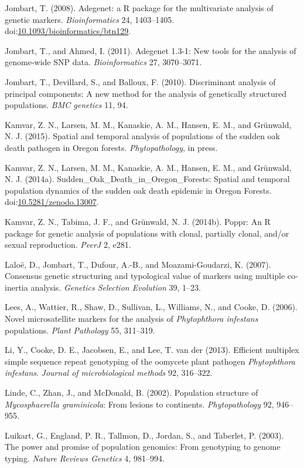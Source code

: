 \documentclass{frontiersSCNS} %
\begin{document}
Jombart, T. (2008). Adegenet: a R package for the multivariate analysis
of genetic markers. \emph{Bioinformatics} 24, 1403--1405.
doi:\href{http://dx.doi.org/10.1093/bioinformatics/btn129}{10.1093/bioinformatics/btn129}.

Jombart, T., and Ahmed, I. (2011). Adegenet 1.3-1: New tools for the
analysis of genome-wide SNP data. \emph{Bioinformatics} 27, 3070--3071.

Jombart, T., Devillard, S., and Balloux, F. (2010). Discriminant
analysis of principal components: A new method for the analysis of
genetically structured populations. \emph{BMC genetics} 11, 94.

Kamvar, Z. N., Larsen, M. M., Kanaskie, A. M., Hansen, E. M., and
Grünwald, N. J. (2015). Spatial and temporal analysis of populations of
the sudden oak death pathogen in Oregon forests. \emph{Phytopathology},
in press.

Kamvar, Z. N., Larsen, M. M., Kanaskie, A. M., Hansen, E. M., and
Grünwald, N. J. (2014a). Sudden\_Oak\_Death\_in\_Oregon\_Forests:
Spatial and temporal population dynamics of the sudden oak death
epidemic in Oregon Forests.
doi:\href{http://dx.doi.org/10.5281/zenodo.13007}{10.5281/zenodo.13007}.

Kamvar, Z. N., Tabima, J. F., and Gr{ü}nwald, N. J. (2014b). Poppr: An R
package for genetic analysis of populations with clonal, partially
clonal, and/or sexual reproduction. \emph{PeerJ} 2, e281.

Lalo{ë}, D., Jombart, T., Dufour, A.-B., and Moazami-Goudarzi, K.
(2007). Consensus genetic structuring and typological value of markers
using multiple co-inertia analysis. \emph{Genetics Selection Evolution}
39, 1--23.

Lees, A., Wattier, R., Shaw, D., Sullivan, L., Williams, N., and Cooke,
D. (2006). Novel microsatellite markers for the analysis of
\emph{Phytophthora infestans} populations. \emph{Plant Pathology} 55,
311--319.

Li, Y., Cooke, D. E., Jacobsen, E., and Lee, T. van der (2013).
Efficient multiplex simple sequence repeat genotyping of the oomycete
plant pathogen \emph{Phytophthora infestans}. \emph{Journal of
microbiological methods} 92, 316--322.

Linde, C., Zhan, J., and McDonald, B. (2002). Population structure of
\emph{Mycosphaerella graminicola}: From lesions to continents.
\emph{Phytopathology} 92, 946--955.

Luikart, G., England, P. R., Tallmon, D., Jordan, S., and Taberlet, P.
(2003). The power and promise of population genomics: From genotyping to
genome typing. \emph{Nature Reviews Genetics} 4, 981--994.
\end{document}

